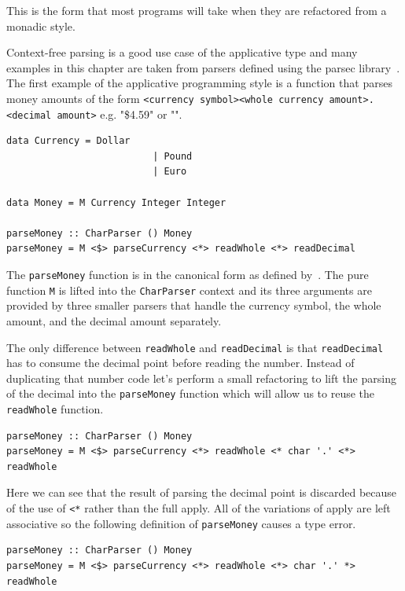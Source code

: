 This is the form that most programs will take when they are refactored from a monadic style. 


 Context-free parsing is a good use case of the applicative type and many examples in this chapter are taken from parsers defined using the parsec library~\citep{parsec}. The first example of the applicative programming style is a function that parses money amounts of the form \texttt{<currency symbol><whole currency amount>.<decimal amount>} e.g. "\$4.59" or "".
 
 \begin{lstlisting}[frame=tblr]
 data Currency = Dollar
                          | Pound
                          | Euro
              
data Money = M Currency Integer Integer

parseMoney :: CharParser () Money
parseMoney = M <$> parseCurrency <*> readWhole <*> readDecimal
 \end{lstlisting}
 
The \texttt{parseMoney} function is in the canonical form as defined by~\cite{mcbrideIdioms}. The pure function \texttt{M} is lifted into the \texttt{CharParser} context and its three arguments are provided by three smaller parsers that handle the currency symbol, the whole amount, and the decimal amount separately. 

The only difference between \texttt{readWhole} and \texttt{readDecimal} is that \texttt{readDecimal} has to consume the decimal point before reading the number. Instead of duplicating that number code let's perform a small refactoring to lift the parsing of the decimal into the \texttt{parseMoney} function which will allow us to reuse the \texttt{readWhole} function.

 \begin{lstlisting}[frame=tblr]
parseMoney :: CharParser () Money
parseMoney = M <$> parseCurrency <*> readWhole <* char '.' <*> readWhole
 \end{lstlisting}
 
 Here we can see that the result of parsing the decimal point is discarded because of the use of \texttt{<*} rather than the full apply. All of the variations of apply are left associative so the following definition of \texttt{parseMoney} causes a type error.
 
  \begin{lstlisting}[frame=tblr]
parseMoney :: CharParser () Money
parseMoney = M <$> parseCurrency <*> readWhole <*> char '.' *> readWhole
 \end{lstlisting}
 
